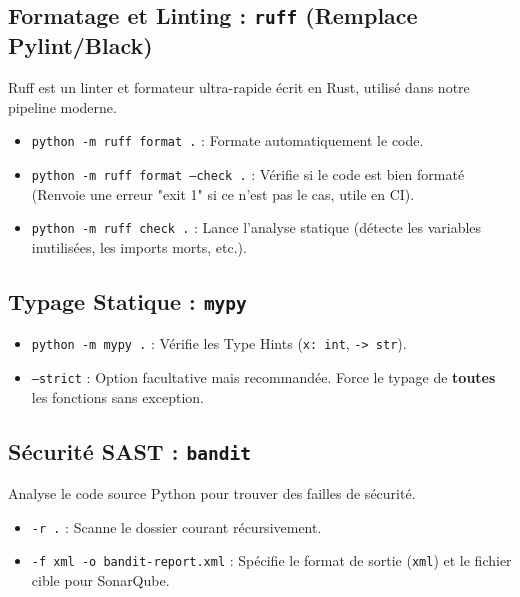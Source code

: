 \documentclass[11pt, a4paper]{report}
\begin{document}
\subsection{Formatage et Linting : \texttt{ruff} (Remplace Pylint/Black)}
Ruff est un linter et formateur ultra-rapide écrit en Rust, utilisé dans notre pipeline moderne.
\begin{itemize}[leftmargin=1.5cm]
    \item \texttt{python -m ruff format .} : Formate automatiquement le code.
    \item \texttt{python -m ruff format --check .} : Vérifie si le code est bien formaté (Renvoie une erreur "exit 1" si ce n'est pas le cas, utile en CI).
    \item \texttt{python -m ruff check .} : Lance l'analyse statique (détecte les variables inutilisées, les imports morts, etc.).
\end{itemize}

\subsection{Typage Statique : \texttt{mypy}}
\begin{itemize}[leftmargin=1.5cm]
    \item \texttt{python -m mypy .} : Vérifie les Type Hints (\texttt{x: int}, \texttt{-> str}).
    \item \texttt{--strict} : Option facultative mais recommandée. Force le typage de \textbf{toutes} les fonctions sans exception.
\end{itemize}

\subsection{Sécurité SAST : \texttt{bandit}}
Analyse le code source Python pour trouver des failles de sécurité.
\begin{itemize}[leftmargin=1.5cm]
    \item \texttt{-r .} : Scanne le dossier courant récursivement.
    \item \texttt{-f xml -o bandit-report.xml} : Spécifie le format de sortie (\texttt{xml}) et le fichier cible pour SonarQube.
\end{itemize}
\end{document}
